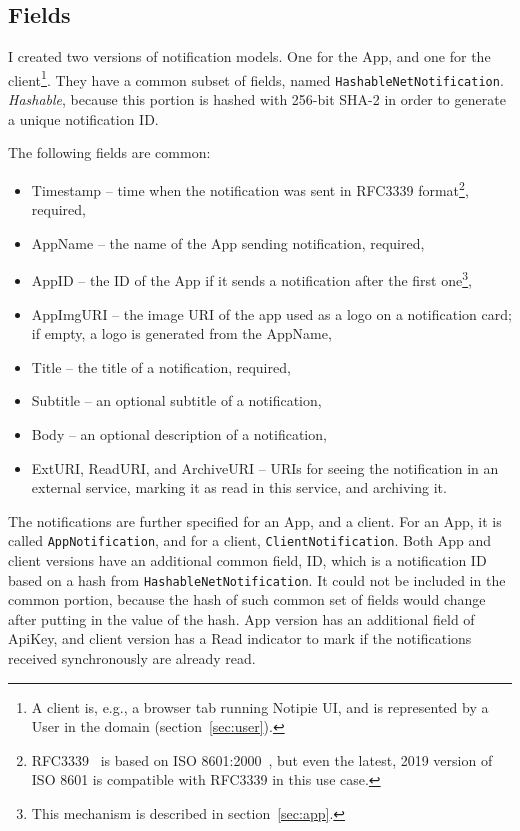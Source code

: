 \subsection{Fields}\label{sec:protocol-fields}

I created two versions of notification models.
One for the App,
and one for the client\footnote{
  A client is, e.g.,
  a browser tab running Notipie UI,
  and is represented
  by a User in the domain (section~\ref{sec:user}).
}.
They have a common subset of fields,
named \texttt{HashableNetNotification}.
\textit{Hashable},
because this portion is hashed with 256-bit SHA-2
in order to generate a unique notification ID.

The following fields are common:

\begin{itemize}
  \item Timestamp -- time when the notification was sent
        in RFC3339 format\footnote{
          RFC3339~\cite{clyne_rfc3339_2002} is based on
          ISO 8601:2000~\cite{international_organization_for_standardization_iso_2000},
          but even the latest, 2019 version of ISO 8601
          is compatible with RFC3339 in this use case.
        }, required,
  \item AppName -- the name of the App sending notification, required,
  \item AppID -- the ID of the App
        if it sends a notification after the first one\footnote{
          This mechanism is described in section~\ref{sec:app}.
        },
  \item AppImgURI -- the image URI of the app
        used as a logo on a notification card;
        if empty, a logo is generated from the AppName,
  \item Title -- the title of a notification, required,
  \item Subtitle -- an optional subtitle of a notification,
  \item Body -- an optional description of a notification,
  \item ExtURI, ReadURI, and ArchiveURI -- URIs
        for seeing the notification in an external service,
        marking it as read in this service, and archiving it.
\end{itemize}

The notifications are further specified
for an App, and a client.
For an App, it is called \texttt{AppNotification},
and for a client, \texttt{ClientNotification}.
Both App and client versions
have an additional common field, ID,
which is a notification ID
based on a hash from \texttt{HashableNetNotification}.
It could not be included in the common portion,
because the hash of such common set of fields
would change after putting in the value of the hash.
App version has an additional field of ApiKey,
and client version has a Read indicator
to mark if the notifications received
synchronously are already read.
